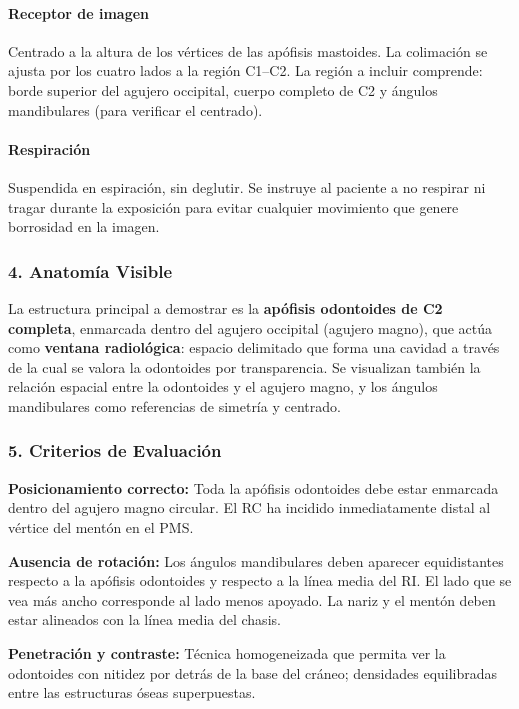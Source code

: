 		\paragraph{Receptor de imagen}
		Centrado a la altura de los vértices de las apófisis mastoides. La colimación se ajusta por los cuatro lados a la región C1--C2. La región a incluir comprende: borde superior del agujero occipital, cuerpo completo de C2 y ángulos mandibulares (para verificar el centrado).
		
		\paragraph{Respiración}
		Suspendida en espiración, sin deglutir. Se instruye al paciente a no respirar ni tragar durante la exposición para evitar cualquier movimiento que genere borrosidad en la imagen.
		
		\subsubsection*{4. Anatomía Visible}
		
		La estructura principal a demostrar es la \textbf{apófisis odontoides de C2 completa}, enmarcada dentro del agujero occipital (agujero magno), que actúa como \textbf{ventana radiológica}: espacio delimitado que forma una cavidad a través de la cual se valora la odontoides por transparencia. Se visualizan también la relación espacial entre la odontoides y el agujero magno, y los ángulos mandibulares como referencias de simetría y centrado.
		
		\subsubsection*{5. Criterios de Evaluación}
		
		\textbf{Posicionamiento correcto:} Toda la apófisis odontoides debe estar enmarcada dentro del agujero magno circular. El RC ha incidido inmediatamente distal al vértice del mentón en el PMS.
		
		\textbf{Ausencia de rotación:} Los ángulos mandibulares deben aparecer equidistantes respecto a la apófisis odontoides y respecto a la línea media del RI. El lado que se vea más ancho corresponde al lado menos apoyado. La nariz y el mentón deben estar alineados con la línea media del chasis.
		
		\textbf{Penetración y contraste:} Técnica homogeneizada que permita ver la odontoides con nitidez por detrás de la base del cráneo; densidades equilibradas entre las estructuras óseas superpuestas.
		
